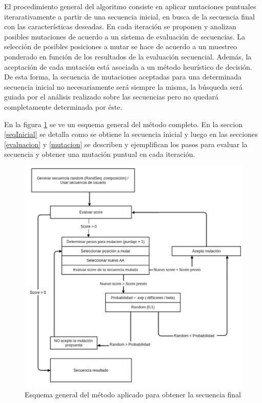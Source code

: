 El procedimiento general del algoritmo consiste en aplicar mutaciones puntuales iterarativamente a partir de una secuencia inicial, en busca de la secuencia final con las características deseadas.
En cada iteración se proponen y analizan posibles mutaciones de acuerdo a un sistema de evaluación de secuencias.
La selección de posibles posiciones a mutar se hace de acuerdo a un muestreo ponderado en función de los resultados de la evaluación secuencial.
Además, la aceptación de cada mutación está asociada a un método heurístico de decisión.
De esta forma, la secuencia de mutaciones aceptadas para una determinada secuencia inicial no necesariamente será siempre la misma, 
la búsqueda será guiada por el análisis realizado sobre las secuencias pero no quedará completamente determinada por éste. 

En la figura \ref{fig:esquema-algoritmo} se ve un esquema general del método completo. 
En la seccion \ref{seqInicial} se detalla como se obtiene la secuencia inicial y luego en las secciones \ref{evaluacion} y \ref{mutacion} se describen y ejemplifican los pasos para evaluar la secuencia y obtener una mutación puntual 
en cada iteración.


\begin{figure}[h!]
\centering
   \includegraphics[width=\textwidth]{img/diagrama-algoritmo-2.png}
 \caption{Esquema general del método aplicado para obtener la secuencia final}
 \label{fig:esquema-algoritmo}
\end{figure}

